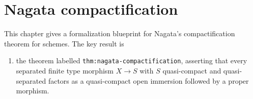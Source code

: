 %
%

\newcommand{\nagataGap}[1]{%
  \par\noindent\textbf{Formalization gap.} #1\par}

\nagataUsesAnnotations

\chapter{Nagata compactification}

This chapter gives a formalization blueprint for Nagata's compactification
theorem for schemes.  The key result is
\begin{enumerate}
  \item the theorem labelled \texttt{thm:nagata-compactification}, asserting
  that every separated
  finite type morphism $X\to S$ with $S$ quasi-compact and quasi-separated
  factors as a quasi-compact open immersion followed by a proper morphism.
\end{enumerate}

